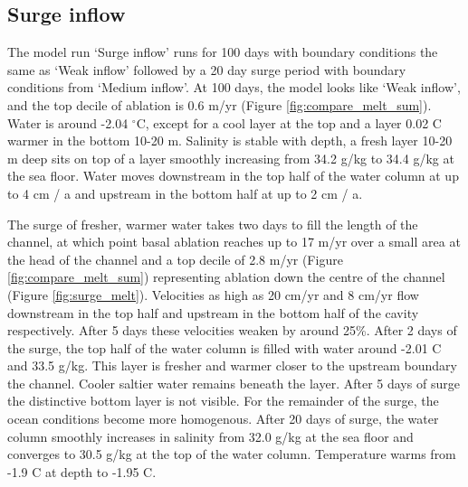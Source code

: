\subsection{Surge inflow} \label{sec:surge_inflow}



The model run `Surge inflow' runs for 100 days with boundary conditions the same as `Weak inflow' followed by a 20 day surge period with boundary conditions from `Medium inflow'. At 100 days, the model looks like `Weak inflow', and the top decile of ablation is 0.6 m/yr (Figure \ref{fig:compare_melt_sum}). Water is around -2.04 $^{\circ}$C, except for a cool layer at the top and a layer 0.02 \textdegree C warmer in the bottom 10-20 m. Salinity is stable with depth, a fresh layer 10-20 m deep sits on top of a layer smoothly increasing from 34.2 g/kg to 34.4 g/kg at the sea floor. Water moves downstream in the top half of the water column at up to 4 cm / a and upstream in the bottom half at up to 2 cm / a. 

The surge of fresher, warmer water takes two days to fill the length of the channel, at which point basal ablation reaches up to 17 m/yr over a small area at the head of the channel and a top decile of 2.8 m/yr (Figure \ref{fig:compare_melt_sum}) representing ablation down the centre of the channel (Figure \ref{fig:surge_melt}). Velocities as high as 20 cm/yr and 8 cm/yr flow downstream in the top half and upstream in the bottom half of the cavity respectively. After 5 days these velocities weaken by around 25\%. After 2 days of the surge, the top half of the water column is filled with water around -2.01 \textdegree C and 33.5 g/kg. This layer is fresher and warmer closer to the upstream boundary the channel. Cooler saltier water remains beneath the layer. After 5 days of surge  the distinctive bottom layer is not visible. For the remainder of the surge, the ocean conditions become more homogenous. After 20 days of surge, the water column smoothly increases in salinity from  32.0 g/kg at the sea floor and converges to 30.5 g/kg at the top of the water column. Temperature warms from -1.9  \textdegree C at depth to -1.95 \textdegree C.


